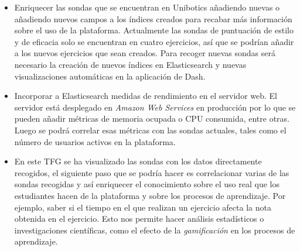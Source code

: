 		\begin{itemize}
\item Enriquecer las sondas que se encuentran en Unibotics añadiendo nuevas o añadiendo nuevos campos a los índices creados para recabar más información sobre el uso de la plataforma. Actualmente las sondas de puntuación de estilo y de eficacia solo se encuentran en cuatro ejercicios, así que se podrían añadir a los nuevos ejercicios que sean creados. Para recoger nuevas sondas será necesario la creación de nuevos índices en Elasticsearch y nuevas visualizaciones automáticas en la aplicación de Dash.
\item Incorporar a Elasticsearch medidas de rendimiento en el servidor web. El servidor está desplegado en \textit{Amazon Web Services} en producción por lo que se pueden añadir métricas de memoria ocupada o CPU consumida, entre otras. Luego se podrá correlar esas métricas con las sondas actuales, tales como el número de usuarios activos en la plataforma.
\item En este TFG se ha visualizado las sondas con los datos directamente recogidos, el siguiente paso que se podría hacer es correlacionar varias de las sondas recogidas y así enriquecer el conocimiento sobre el uso real que los estudiantes hacen de la plataforma y sobre los procesos de aprendizaje. Por ejemplo, saber si el tiempo en el que realizan un ejercicio afecta la nota obtenida en el ejercicio. Esto nos permite hacer análisis estadísticos o investigaciones científicas, como el efecto de la \textit{gamificación} en los procesos de aprendizaje.\\
		\end{itemize}